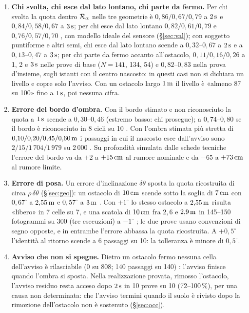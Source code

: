 \begin{enumerate}[label=\arabic*.,ref=\arabic*,leftmargin=1.8em]
\item \textbf{Chi svolta, chi esce dal lato lontano, chi parte da fermo.} Per chi svolta la quota dentro $\mathcal{R}_\alpha$ nelle tre geometrie è $0{,}86/0{,}67/0{,}79$ a $2\,\mathrm{s}$ e $0{,}84/0{,}58/0{,}67$ a $3\,\mathrm{s}$; per chi esce dal lato lontano $0{,}82/0{,}61/0{,}79$ e $0{,}76/0{,}57/0{,}70$ , con modello ideale del sensore (\S\ref{sec:val}); con soggetto puntiforme e altri semi, chi esce dal lato lontano scende a $0{,}32$--$0{,}67$ a $2\,\mathrm{s}$ e a $0{,}13$--$0{,}47$ a $3\,\mathrm{s}$; per chi parte da fermo accanto all'ostacolo, $0{,}11/0{,}16/0{,}26$ a 1, 2 e $3\,\mathrm{s}$ nelle prove di base ($N=141$, 134, 54) e $0{,}82$--$0{,}83$ nella prova d'insieme, sugli istanti con il centro nascosto: in questi casi non si dichiara un livello e copre solo l'avviso. Con un ostacolo largo $1\,\mathrm{m}$ il livello è «almeno 87 su 100» fino a $1\,\mathrm{s}$, poi nessuna cifra.
\item \textbf{Errore del bordo d'ombra.} Con il bordo stimato e non riconosciuto la quota a $1\,\mathrm{s}$ scende a $0{,}30$--$0{,}46$ (estremo basso: chi prosegue); a $0{,}74$--$0{,}80$ se il bordo è riconosciuto in 8 cicli su 10 . Con l'ombra stimata più stretta di $0{,}10/0{,}20/0{,}45/0{,}60\,\mathrm{m}$ i passaggi in cui il nascosto esce dall'avviso sono $2/15/1\,704/1\,979$ su 2\,000 . Su profondità simulata dalle schede tecniche l'errore del bordo va da $+2$ a $+15\,\mathrm{cm}$ al rumore nominale e da $-65$ a $+73\,\mathrm{cm}$ al rumore limite.
\item\label{lim:posa} \textbf{Errore di posa.} Un errore d'inclinazione $\delta\theta$ sposta la quota ricostruita di circa $\rho\,\delta\theta$ (\S\ref{sec:geo}): un ostacolo di $10\,\mathrm{cm}$ scende sotto la soglia di $7\,\mathrm{cm}$ con $0{,}67^\circ$ a $2{,}55\,\mathrm{m}$ e $0{,}57^\circ$ a $3\,\mathrm{m}$ . Con $+1^\circ$ lo stesso ostacolo a $2{,}55\,\mathrm{m}$ risulta «libero» in 7 celle su 7, e una scatola di $10\,\mathrm{cm}$ fra $2{,}6$ e $2{,}9\,\mathrm{m}$ in 145--150 fotogrammi su 300 (tre esecuzioni) a $-1^\circ$ ; le due prove usano convenzioni di segno opposte, e in entrambe l'errore abbassa la quota ricostruita. A $+0{,}5^\circ$ l'identità al ritorno scende a 6 passaggi su 10: la tolleranza è minore di $0{,}5^\circ$.
\item \textbf{Avviso che non si spegne.} Dietro un ostacolo fermo nessuna cella dell'avviso è rilasciabile (0 su 808; 140 passaggi su 140) : l'avviso finisce quando l'ombra si sposta. Nella realizzazione provata, rimosso l'ostacolo, l'avviso residuo resta acceso dopo $2\,\mathrm{s}$ in 10 prove su 10 (72--100\,\%), per una causa non determinata: che l'avviso termini quando il suolo è rivisto dopo la rimozione dell'ostacolo non è sostenuto  (\S\ref{sec:occ}).

\end{enumerate}
